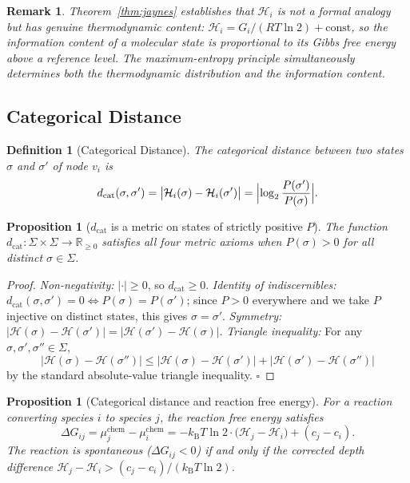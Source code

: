 \documentclass[twocolumn,10pt,a4paper]{article}
\newcommand{\kB}{k_{\mathrm{B}}}
\newcommand{\Hcat}{\mathcal{H}}
\newcommand{\dcat}{d_{\mathrm{cat}}}
\newtheorem{proposition}[theorem]{Proposition}
\newtheorem{definition}[theorem]{Definition}
\newtheorem{remark}[theorem]{Remark}
\begin{document}
\begin{remark}
Theorem~\ref{thm:jaynes} establishes that $\Hcat_i$ is not a formal analogy
but has genuine thermodynamic content: $\Hcat_i = G_i/(RT\ln 2) + \mathrm{const}$,
so the information content of a molecular state is proportional to its Gibbs
free energy above a reference level.  The maximum-entropy principle
simultaneously determines both the thermodynamic distribution and the
information content.
\end{remark}

\subsection{Categorical Distance}
\label{sec:info-catdist}

\begin{definition}[Categorical Distance]
\label{def:catdist}
The \emph{categorical distance} between two states $\sigma$ and $\sigma'$ of
node $v_i$ is
\begin{equation}
  \dcat(\sigma,\sigma') = \bigl|\Hcat_i(\sigma)-\Hcat_i(\sigma')\bigr|
                        = \Bigl|\log_2\frac{P(\sigma')}{P(\sigma)}\Bigr|.
  \label{eq:catdist}
\end{equation}
\end{definition}

\begin{proposition}[$\dcat$ is a metric on states of strictly positive $P$]
\label{prop:catdist-metric}
The function $\dcat:\Sigma\times\Sigma\to\mathbb{R}_{\geq 0}$ satisfies all
four metric axioms when $P(\sigma)>0$ for all distinct $\sigma\in\Sigma$.
\end{proposition}

\begin{proof}
\emph{Non-negativity:} $|\cdot|\geq 0$, so $\dcat\geq 0$.
\emph{Identity of indiscernibles:} $\dcat(\sigma,\sigma')=0
\Leftrightarrow P(\sigma)=P(\sigma')$; since $P>0$ everywhere and we take $P$
injective on distinct states, this gives $\sigma=\sigma'$.
\emph{Symmetry:} $|\Hcat(\sigma)-\Hcat(\sigma')|=|\Hcat(\sigma')-\Hcat(\sigma)|$.
\emph{Triangle inequality:} For any $\sigma,\sigma',\sigma''\in\Sigma$,
\[
  |\Hcat(\sigma)-\Hcat(\sigma'')| \leq |\Hcat(\sigma)-\Hcat(\sigma')|
  +|\Hcat(\sigma')-\Hcat(\sigma'')|
\]
by the standard absolute-value triangle inequality.  $\square$
\end{proof}

\begin{proposition}[Categorical distance and reaction free energy]
\label{prop:catdist-dG}
For a reaction converting species $i$ to species $j$, the reaction free energy
satisfies
\begin{equation}
  \Delta G_{ij} = \mu_j^{\mathrm{chem}}-\mu_i^{\mathrm{chem}}
    = -\kB T\ln 2\cdot\bigl(\Hcat_j-\Hcat_i\bigr) + (c_j-c_i).
  \label{eq:catdist-dG}
\end{equation}
The reaction is spontaneous ($\Delta G_{ij}<0$) if and only if the corrected
depth difference $\Hcat_j - \Hcat_i > (c_j-c_i)/(\kB T\ln 2)$.
\end{proposition}
\end{document}
